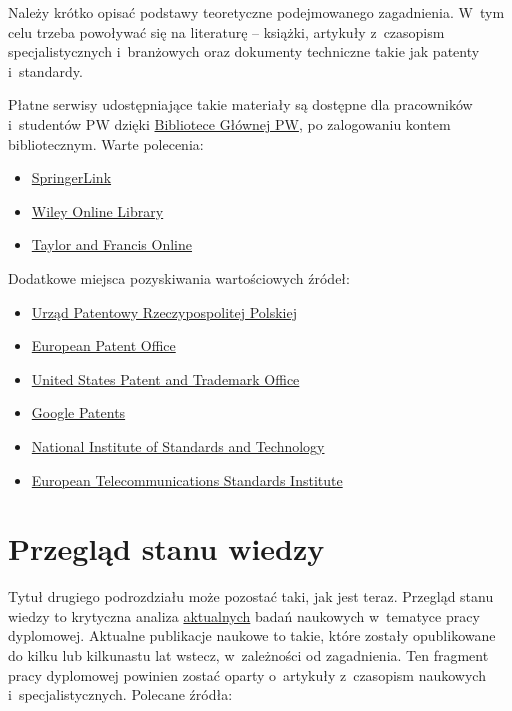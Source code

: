 Należy krótko opisać podstawy teoretyczne podejmowanego zagadnienia. W~tym celu trzeba powoływać się na literaturę -- książki, artykuły z~czasopism specjalistycznych i~branżowych oraz dokumenty techniczne takie jak patenty i~standardy.

Płatne serwisy udostępniające takie materiały są dostępne dla pracowników i~studentów PW dzięki \href{https://bg.pw.edu.pl/}{Bibliotece Głównej PW}, po zalogowaniu kontem bibliotecznym. Warte polecenia:

\begin{itemize}
	\item \href{http://eczyt.bg.pw.edu.pl/han/SpringerLink}{SpringerLink}
	\item \href{http://eczyt.bg.pw.edu.pl/han/Wiley}{Wiley Online Library}
	\item \href{http://eczyt.bg.pw.edu.pl/han/TaylorandFrancis}{Taylor and Francis Online}
\end{itemize}

Dodatkowe miejsca pozyskiwania wartościowych źródeł:

\begin{itemize}
		
	\item \href{https://uprp.gov.pl/}{Urząd Patentowy Rzeczypospolitej Polskiej}
	\item \href{https://www.epo.org/en}{European Patent Office}
	\item \href{https://www.uspto.gov/}{United States Patent and Trademark Office}
	\item \href{https://patents.google.com/}{Google Patents}
	\item \href{https://www.nist.gov/}{National Institute of Standards and Technology}
	\item \href{https://www.etsi.org/}{European Telecommunications Standards Institute}
\end{itemize}

\section{Przegląd stanu wiedzy}

Tytuł drugiego podrozdziału może pozostać taki, jak jest teraz. Przegląd stanu wiedzy to krytyczna analiza \underline{aktualnych} badań naukowych w~tematyce pracy dyplomowej. Aktualne publikacje naukowe to takie, które zostały opublikowane do kilku lub kilkunastu lat wstecz, w~zależności od zagadnienia. Ten fragment pracy dyplomowej powinien zostać oparty o~artykuły z~czasopism naukowych i~specjalistycznych. Polecane źródła:


